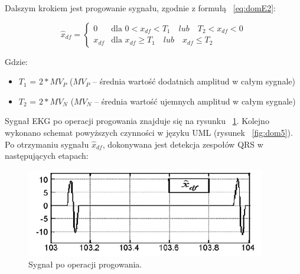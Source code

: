 \documentclass[10pt,a4paper]{article}
\begin{document}
Dalszym krokiem jest progowanie sygnału, zgodnie z formułą ~\ref{eq:domE2}:

\begin{equation} \label{eq:domE2}
	\hat{x}_{df} = \left\{ \begin{array}{ll}
	0 & \textrm{dla $0<x_{df}<T_1 \quad lub \quad T_2<x_{df}<0$}\\
	x_{df} & \textrm{dla $x_{df}\geq T_1 \quad lub \quad x_{df} \leq T_2$}
	\end{array} \right.
\end{equation}

Gdzie:

\begin{itemize}
	\item $T_1$ = $2*MV_P$ ($MV_P$ – średnia wartość dodatnich amplitud w całym sygnale)
	\item $T_2$ = $2*MV_N$ ($MV_N$ – średnia wartość ujemnych amplitud w całym sygnale)
\end{itemize}

Sygnał EKG po operacji progowania znajduje się na rysunku ~\ref{fig:dom4}. Kolejno wykonano schemat powyższych czynności w języku UML (rysunek ~\ref{fig:dom5}). Po otrzymaniu sygnału $\hat{x}_{df}$, dokonywana jest detekcja zespołów QRS w następujących etapach: 

\begin{figure}
  	\centering
    \includegraphics{dom4}
    \caption{Sygnał po operacji progowania.}
  	\label{fig:dom4}
\end{figure}
\end{document}
